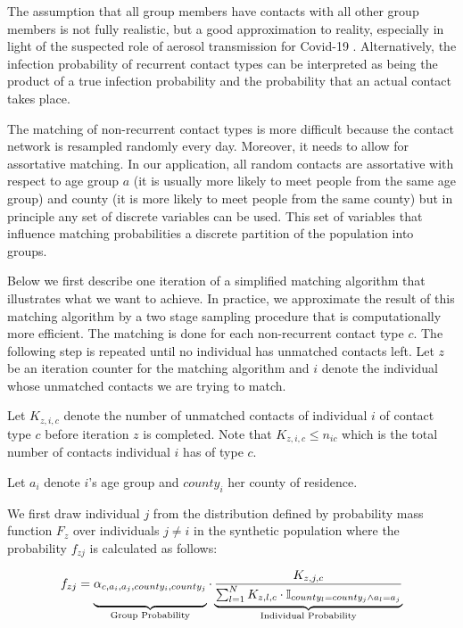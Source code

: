 The assumption that all group members have contacts with all other group members
is not fully realistic, but a good approximation to reality, especially in
light of the suspected role of aerosol transmission for Covid-19 \citep{Morawska2020,
Anderson2020}. Alternatively, the infection probability of recurrent contact types can
be interpreted as being the product of a true infection probability and the probability
that an actual contact takes place.


The matching of non-recurrent contact types is more difficult because the contact network
is resampled randomly every day. Moreover, it needs to allow for assortative matching. In
our application, all random contacts are assortative with respect to age group $a$ (it is
usually more likely to meet people from the same age group) and county (it is more likely
to meet people from the same county) but in principle any set of discrete variables can
be used. This set of variables that influence matching probabilities
 a discrete partition of the population into groups.

Below we first describe one iteration of a simplified matching algorithm that
illustrates what we want to achieve. In practice, we approximate the result of this
matching algorithm by a two stage sampling procedure that is computationally more
efficient. The matching is done for each non-recurrent contact type $c$. The following
step is repeated until no individual has unmatched contacts left. Let $z$ be an iteration
counter for the matching algorithm and $i$ denote the individual whose unmatched
contacts we are trying to match.

Let $K_{z,i,c}$ denote the number of unmatched contacts of individual $i$ of contact type
$c$ before iteration $z$ is completed. Note that $K_{z,i,c} \leq n_{ic}$ which is the
total number of contacts individual $i$ has of type $c$.

Let $a_i$ denote $i$'s age group and $county_i$ her county of residence.

We first draw individual $j$ from the distribution defined by probability mass function
$F_{z}$ over individuals $j \neq i$ in the synthetic population where the probability
$f_{zj}$ is calculated as follows:

\begin{equation}
    \label{eq:combined_matching_probabilities}
    f_{zj} = \underbrace{\alpha_{c,a_i,a_j, county_i, county_j}\vphantom{\frac{bla}{\sum_i^k}}}_{\text{Group Probability}} \cdot \underbrace{\frac{K_{z,j,c}}{\sum_{l=1}^N K_{z,l,c} \cdot \mathbb{I}_{county_l=county_j \land a_l = a_j}}}_{\text{Individual Probability}}
\end{equation}

